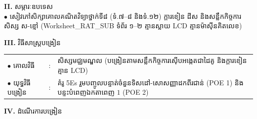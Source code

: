 \documentclass[a4paper,10pt]{article}
\newcommand{\en}[1]{{\TimesEn #1}}
\begin{document}
{%
\textbf{II.} {\muol សម្ភារៈឧបទេស}\\[1pt]
\hspace*{0.55cm}$\bullet$ \hspace{0.35cm} សៀវភៅសិក្សាគោលគណិតវិទ្យាថ្នាក់ទី៨ (ទំ.៧–៨ និងទំ.១២) ក្ដារខៀន ដីស និងសន្លឹកកិច្ចការសិស្ស ស-ខ្មៅ (\en{Worksheet\_RAT\_SUB} ទំព័រ ១–២ គ្មានស្លាយ \en{LCD} គ្មានម៉ាស៊ីនគិតលេខ)

\vspace{2pt}

\textbf{III.} {\muol វិធីសាស្រ្តបង្រៀន}\\[1pt]
\hspace*{0.45cm}%
\begin{tabular}{@{}l l L{14.85cm}@{}}
  $\bullet$ \hspace{0.25cm} គោលវិធី & : & សិស្សមជ្ឈមណ្ឌល (បង្រៀនតាមសន្លឹកកិច្ចការស៊ើបអង្កេតជាដៃគូ និងក្ដារខៀន គ្មាន \en{LCD}) \\
  $\bullet$ \hspace{0.25cm} យុទ្ធវិធីបង្រៀន & : & គំរូ \en{5Es} រួមបញ្ចូលបន្ទាត់ចំនួនទិសដៅ-សោសញ្ញាដកពីរជាន់ \en{(POE 1)} និងបន្ទះបំពេញឯកតាពេញ $1$ \en{(POE 2)} \\
\end{tabular}
}

\vspace{2pt}

\textbf{IV.} {\muol ដំណើរការបង្រៀន}

\vspace{1pt}
\end{document}
